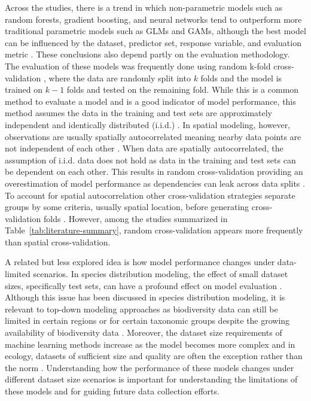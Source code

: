 Across the studies, there is a trend in which non-parametric models such as random forests, gradient boosting, and neural networks tend to outperform more traditional parametric models such as GLMs and GAMs, although the best model can be influenced by the dataset, predictor set, response variable, and evaluation metric \parencite{mondal2021, cai2023, brugere2023, ngor2023, baggstrom2025}. These conclusions also depend partly on the evaluation methodology. The evaluation of these models was frequently done using random k-fold cross-validation \parencite{cai2023, brugere2023, baggstrom2025}, where the data are randomly split into \(k\) folds and the model is trained on \(k-1\) folds and tested on the remaining fold. While this is a common method to evaluate a model and is a good indicator of model performance, this method assumes the data in the training and test sets are approximately independent and identically distributed (i.i.d.) \parencite{efron_estimating_1983}. In spatial modeling, however, observations are usually spatially autocorrelated meaning nearby data points are not independent of each other \parencite{elith2009}. When data are spatially autocorrelated, the assumption of i.i.d. data does not hold as data in the training and test sets can be dependent on each other. This results in random cross-validation providing an overestimation of model performance as dependencies can leak across data splits \parencite{wang2023}. To account for spatial autocorrelation other cross-validation strategies separate groups by some criteria, usually spatial location, before generating cross-validation folds \parencite{roberts2017, valavi2019}. However, among the studies summarized in Table~\ref{tab:literature-summary}, random cross-validation appears more frequently than spatial cross-validation.

A related but less explored idea is how model performance changes under data-limited scenarios. In species distribution modeling, the effect of small dataset sizes, specifically test sets, can have a profound effect on model evaluation \parencite{collart_small_2023}. Although this issue has been discussed in species distribution modeling, it is relevant to top-down modeling approaches as biodiversity data can still be limited in certain regions or for certain taxonomic groups despite the growing availability of biodiversity data \parencite{wuest2020}. Moreover, the dataset size requirements of machine learning methods increase as the model becomes more complex and in ecology, datasets of sufficient size and quality are often the exception rather than the norm \parencite{pichler2023}. Understanding how the performance of these models changes under different dataset size scenarios is important for understanding the limitations of these models and for guiding future data collection efforts.

